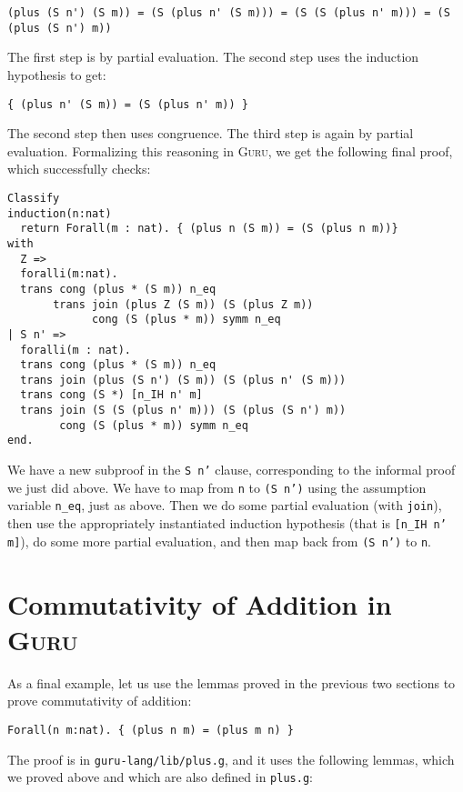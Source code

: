 \documentclass{book}[12pt]
\newcommand{\guru}[0]{\textsc{Guru}\xspace}
\begin{document}
{\small
\begin{verbatim}
(plus (S n') (S m)) = (S (plus n' (S m))) = (S (S (plus n' m))) = (S (plus (S n') m))
\end{verbatim}
}

\noindent The first step is by partial evaluation.  The second step
uses the induction hypothesis to get:

\begin{verbatim}
{ (plus n' (S m)) = (S (plus n' m)) }
\end{verbatim}

\noindent The second step then uses congruence.  The third step is
again by partial evaluation.  Formalizing this reasoning in \guru, we get
the following final proof, which successfully checks:

\begin{verbatim}
Classify
induction(n:nat) 
  return Forall(m : nat). { (plus n (S m)) = (S (plus n m))}
with
  Z => 
  foralli(m:nat).
  trans cong (plus * (S m)) n_eq
       trans join (plus Z (S m)) (S (plus Z m))
             cong (S (plus * m)) symm n_eq
| S n' => 
  foralli(m : nat).
  trans cong (plus * (S m)) n_eq
  trans join (plus (S n') (S m)) (S (plus n' (S m)))
  trans cong (S *) [n_IH n' m]
  trans join (S (S (plus n' m))) (S (plus (S n') m))
        cong (S (plus * m)) symm n_eq
end.
\end{verbatim}

\noindent We have a new subproof in the \texttt{S n'} clause,
corresponding to the informal proof we just did above.  We have to map
from \texttt{n} to \texttt{(S n')} using the assumption variable
\texttt{n\_eq}, just as above.  Then we do some partial evaluation
(with \texttt{join}), then use the appropriately instantiated
induction hypothesis (that is \texttt{[n\_IH\ n' m]}), do some more
partial evaluation, and then map back from \texttt{(S n')} to
\texttt{n}.

\section{Commutativity of Addition in \guru}

As a final example, let us use the lemmas proved in the previous
two sections to prove commutativity of addition:

\begin{verbatim}
Forall(n m:nat). { (plus n m) = (plus m n) }
\end{verbatim}

\noindent The proof is in \texttt{guru-lang/lib/plus.g}, and it uses the
following lemmas, which we proved above and which are also defined in \texttt{plus.g}:
\end{document}

